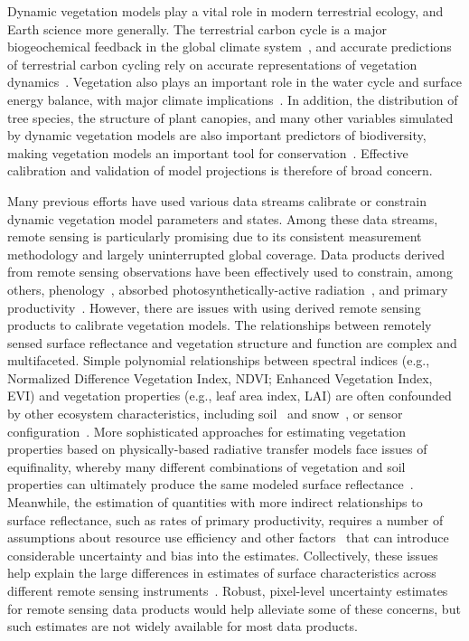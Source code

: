 \introduction  %

Dynamic vegetation models play a vital role in modern terrestrial ecology, and Earth science more generally.
The terrestrial carbon cycle is a major biogeochemical feedback in the global climate system~\citep{heinze_2019_esd_reviews}, and accurate predictions of terrestrial carbon cycling rely on accurate representations of vegetation dynamics~\citep{pacala_1995_details_that_matter}.
Vegetation also plays an important role in the water cycle and surface energy balance, with major climate implications~\citep{bonan2008forests}.
In addition, the distribution of tree species, the structure of plant canopies, and many other variables simulated by dynamic vegetation models are also important predictors of biodiversity, making vegetation models an important tool for conservation~\citep{mcmahon2011improving}.
Effective calibration and validation of model projections is therefore of broad concern.

Many previous efforts have used various data streams calibrate or constrain dynamic vegetation model parameters and states.
Among these data streams, remote sensing is particularly promising due to its consistent measurement methodology and largely uninterrupted global coverage.
Data products derived from remote sensing observations have been effectively used to constrain, among others,
phenology~\citep{knorr2010carbon, viskari2015modeldata},
absorbed photosynthetically-active radiation~\citep{peylin2016new, schurmann2016constraining},
and primary productivity~\citep{macbean2018strong}.
However, there are issues with using derived remote sensing products to calibrate vegetation models.
The relationships between remotely sensed surface reflectance and vegetation structure and function are complex and multifaceted.
Simple polynomial relationships between spectral indices (e.g., Normalized Difference Vegetation Index, NDVI; Enhanced Vegetation Index, EVI) and vegetation properties (e.g., leaf area index, LAI) are often confounded by other ecosystem characteristics, including soil~\citep{myneni1994relationship} and snow~\citep{zhang2020evaluating}, or sensor configuration~\citep{fensholt2004evaluation}.
More sophisticated approaches for estimating vegetation properties based on physically-based radiative transfer models face issues of equifinality, whereby many different combinations of vegetation and soil properties can ultimately produce the same modeled surface reflectance~\citep{combal2003retrieval, lewis2007spectral}.
Meanwhile, the estimation of quantities with more indirect relationships to surface reflectance, such as rates of primary productivity, requires a number of assumptions about resource use efficiency and other factors~\citep{running2004continuous} that can introduce considerable uncertainty and bias into the estimates.
Collectively, these issues help explain the large differences in estimates of surface characteristics across different remote sensing instruments~\citep{liu_2018_satellite}.
Robust, pixel-level uncertainty estimates for remote sensing data products would help alleviate some of these concerns, but such estimates are not widely available for most data products.

